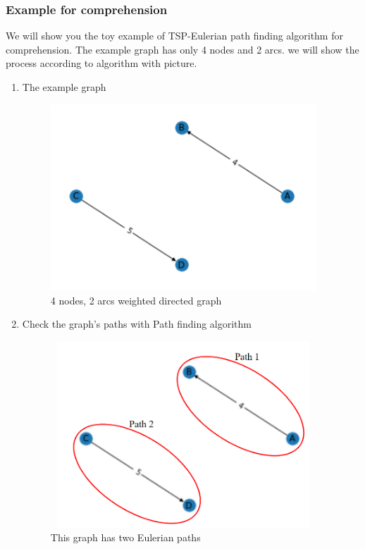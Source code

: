 \documentclass{article}
\begin{document}
\subsubsection{Example for comprehension}
We will show you the toy example of TSP-Eulerian path finding algorithm for comprehension. The example graph has only 4 nodes and 2 arcs. we will show the process according to algorithm with picture.
\begin{enumerate}
    \item The example graph
    \begin{figure}[H]
        \centering
        \includegraphics[width=10cm,height=7cm]{ex_img1.png}
        \caption{4 nodes, 2 arcs weighted directed graph}
    \end{figure}
    
    \newpage
    \item Check the graph's paths with Path finding algorithm
    \begin{figure}[H]
        \centering
        \includegraphics[width=10cm,height=7cm]{ex_img2.png}
        \caption{This graph has two Eulerian paths}
    \end{figure}


\end{enumerate}
\end{document}

